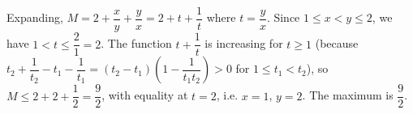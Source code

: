 Expanding, $M=2+\dfrac {x}{y}+\dfrac {y}{x}=2+t+\dfrac{1}{t}$ where $t=\dfrac {y}{x}$. Since $1\le x<y\le2$, we have $1<t\le\dfrac{2}{1}=2$. The function $t+\dfrac{1}{t}$ is increasing for $t\ge1$ (because $t_2+\dfrac{1}{t_2}-t_1-\dfrac{1}{t_1}=(t_2-t_1)\left(1-\dfrac{1}{t_1t_2}\right)>0$ for $1\le t_1<t_2$), so $M\le 2+2+\dfrac{1}{2}=\dfrac{9}{2}$, with equality at $t=2$, i.e. $x=1$, $y=2$. The maximum is $\boxed{\dfrac{9}{2}}$.
